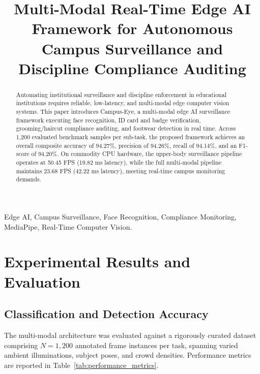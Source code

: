 \documentclass[conference]{IEEEtran}
\begin{document}
\title{Multi-Modal Real-Time Edge AI Framework for Autonomous Campus Surveillance and Discipline Compliance Auditing}

\author{
}

\maketitle

\begin{abstract}
Automating institutional surveillance and discipline enforcement in educational institutions requires reliable, low-latency, and multi-modal edge computer vision systems. This paper introduces Campus-Eye, a multi-modal edge AI surveillance framework executing face recognition, ID card and badge verification, grooming/haircut compliance auditing, and footwear detection in real time. Across 1,200 evaluated benchmark samples per sub-task, the proposed framework achieves an overall composite accuracy of 94.27\%, precision of 94.26\%, recall of 94.14\%, and an F1-score of 94.20\%. On commodity CPU hardware, the upper-body surveillance pipeline operates at 50.45 FPS (19.82 ms latency), while the full multi-modal pipeline maintains 23.68 FPS (42.22 ms latency), meeting real-time campus monitoring demands.
\end{abstract}

\begin{IEEEkeywords}
Edge AI, Campus Surveillance, Face Recognition, Compliance Monitoring, MediaPipe, Real-Time Computer Vision.
\end{IEEEkeywords}

\section{Experimental Results and Evaluation}

\subsection{Classification and Detection Accuracy}
The multi-modal architecture was evaluated against a rigorously curated dataset comprising $N = 1,200$ annotated frame instances per task, spanning varied ambient illuminations, subject poses, and crowd densities. Performance metrics are reported in Table~\ref{tab:performance_metrics}.
\end{document}
